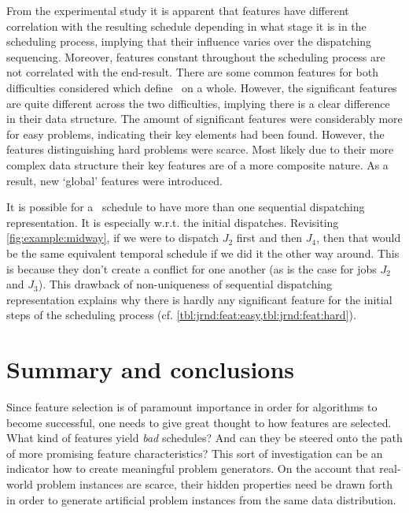 From the experimental study it is apparent that features have different %
correlation with the resulting schedule depending in what stage it is in the 
scheduling process, implying that their influence varies over the dispatching 
sequencing. Moreover, features constant throughout the scheduling process are 
not correlated with the end-result.
There are some common features for both difficulties considered which define 
\jsp\ on a whole. However, the significant features are quite different across 
the two difficulties, implying there is a clear difference in their data 
structure. The amount of significant features were considerably more for easy 
problems, indicating their key elements had been found. However, the features 
distinguishing hard problems were scarce. Most likely due to their more complex 
data structure their key features are of a more composite nature. As a result, 
new `global' features were introduced. 

It is possible for a \JSP\ schedule to have more than one sequential 
dispatching representation. It is especially w.r.t. the initial dispatches. 
Revisiting \cref{fig:example:midway}, if we were to dispatch $J_2$ 
first and then $J_4$, then that would be the same equivalent
temporal schedule if we did it the other way around. 
This is because they don't create a conflict for one another 
(as is the case for jobs $J_2$ and $J_3$). This drawback of non-uniqueness of 
sequential dispatching representation explains why there is hardly any 
significant feature for the initial steps of the scheduling process (cf. 
\cref{tbl:jrnd:feat:easy,tbl:jrnd:feat:hard}). 

\section{Summary and conclusions}
Since feature selection is of paramount importance in order for algorithms to 
become successful, one needs to give great thought to how features are 
selected. What kind of features yield \emph{bad} schedules? And can they be 
steered onto the path of more promising feature characteristics? This sort of 
investigation can be an indicator how to create meaningful problem generators. 
On the account that real-world problem instances are scarce, their hidden 
properties need be drawn forth in order to generate artificial problem 
instances from the same data distribution. 

